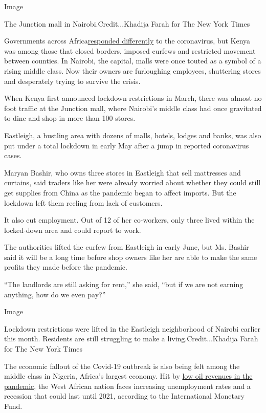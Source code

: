 Image

The Junction mall in Nairobi.Credit...Khadija Farah for The New York
Times

Governments across
Africa\href{https://www.nytimes.com/2020/03/27/world/africa/south-africa-coronavirus.html}{responded
differently} to the coronavirus, but Kenya was among those that closed
borders, imposed curfews and restricted movement between counties. In
Nairobi, the capital, malls were once touted as a symbol of a rising
middle class. Now their owners are furloughing employees, shuttering
stores and desperately trying to survive the crisis.

When Kenya first announced lockdown restrictions in March, there was
almost no foot traffic at the Junction mall, where Nairobi's middle
class had once gravitated to dine and shop in more than 100 stores.

Eastleigh, a bustling area with dozens of malls, hotels, lodges and
banks, was also put under a total lockdown in early May after a jump in
reported coronavirus cases.

Maryan Bashir, who owns three stores in Eastleigh that sell mattresses
and curtains, said traders like her were already worried about whether
they could still get supplies from China as the pandemic began to affect
imports. But the lockdown left them reeling from lack of customers.

It also cut employment. Out of 12 of her co-workers, only three lived
within the locked-down area and could report to work.

The authorities lifted the curfew from Eastleigh in early June, but Ms.
Bashir said it will be a long time before shop owners like her are able
to make the same profits they made before the pandemic.

``The landlords are still asking for rent,'' she said, ``but if we are
not earning anything, how do we even pay?''

Image

Lockdown restrictions were lifted in the Eastleigh neighborhood of
Nairobi earlier this month. Residents are still struggling to make a
living.Credit...Khadija Farah for The New York Times

The economic fallout of the Covid-19 outbreak is also being felt among
the middle class in Nigeria, Africa's largest economy. Hit by
\href{https://www.nytimes.com/2020/04/22/world/middleeast/oil-price-collapse-coronavirus.html}{low
oil revenues in the pandemic}, the West African nation faces increasing
unemployment rates and a recession that could last until 2021, according
to the International Monetary Fund.

